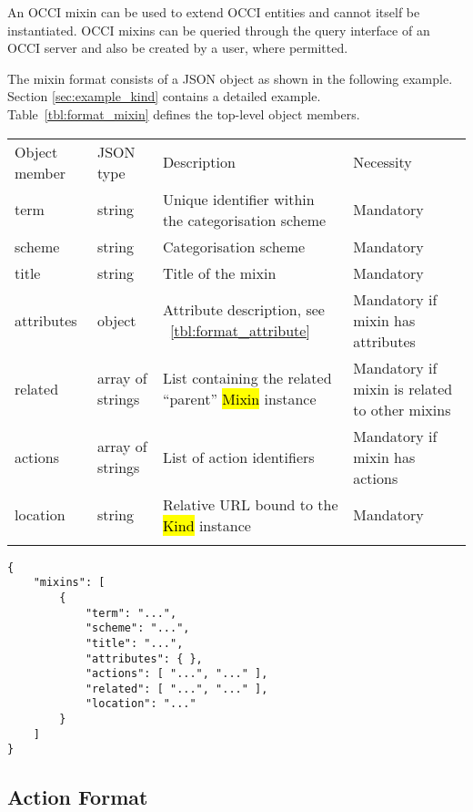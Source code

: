 \documentclass[10pt,a4paper]{article}
\begin{document}
An OCCI mixin can be used to extend OCCI entities and cannot itself be 
instantiated. OCCI mixins can be queried through the query interface 
of an OCCI server and also be created by a user, where permitted.

The mixin format consists of a JSON object as shown in the
following example. Section \ref{sec:example_kind} contains a detailed example.
Table~\ref{tbl:format_mixin} defines the top-level object members.

 {
    \begin{tabular}{llll}
    \toprule
    Object member & JSON type & Description & Necessity\\
    \colrule
    term & string & Unique identifier within the categorisation scheme & Mandatory\\
    scheme & string & Categorisation scheme & Mandatory\\
    title & string & Title of the mixin & Mandatory\\
    attributes & object & Attribute description, see ~\ref{tbl:format_attribute} & Mandatory if mixin has attributes\\
    related & array of strings & List containing the related ``parent'' \hl{Mixin} instance & Mandatory if mixin is related to other mixins\\
    actions & array of strings & List of action identifiers & Mandatory if mixin has actions\\
    location & string & Relative URL bound to the \hl{Kind} instance & Mandatory\\
    \botrule
    \end{tabular}
}

\begin{verbatim}
{
    "mixins": [
        {
            "term": "...",
            "scheme": "...",
            "title": "...",
            "attributes": { },
            "actions": [ "...", "..." ],
            "related": [ "...", "..." ],
            "location": "..."
        }
    ]
}
\end{verbatim}

\subsection{Action Format}
\label{sec:format_action}
\end{document}
